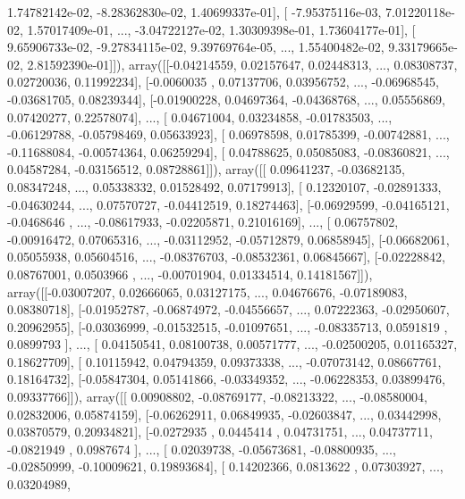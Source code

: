 \documentclass{article}
\begin{document}
          1.74782142e-02,  -8.28362830e-02,   1.40699337e-01],
       [ -7.95375116e-03,   7.01220118e-02,   1.57017409e-01, ...,
         -3.04722127e-02,   1.30309398e-01,   1.73604177e-01],
       [  9.65906733e-02,  -9.27834115e-02,   9.39769764e-05, ...,
          1.55400482e-02,   9.33179665e-02,   2.81592390e-01]]), array([[-0.04214559,  0.02157647,  0.02448313, ...,  0.08308737,
         0.02720036,  0.11992234],
       [-0.0060035 ,  0.07137706,  0.03956752, ..., -0.06968545,
        -0.03681705,  0.08239344],
       [-0.01900228,  0.04697364, -0.04368768, ...,  0.05556869,
         0.07420277,  0.22578074],
       ..., 
       [ 0.04671004,  0.03234858, -0.01783503, ..., -0.06129788,
        -0.05798469,  0.05633923],
       [ 0.06978598,  0.01785399, -0.00742881, ..., -0.11688084,
        -0.00574364,  0.06259294],
       [ 0.04788625,  0.05085083, -0.08360821, ...,  0.04587284,
        -0.03156512,  0.08728861]]), array([[ 0.09641237, -0.03682135,  0.08347248, ...,  0.05338332,
         0.01528492,  0.07179913],
       [ 0.12320107, -0.02891333, -0.04630244, ...,  0.07570727,
        -0.04412519,  0.18274463],
       [-0.06929599, -0.04165121, -0.0468646 , ..., -0.08617933,
        -0.02205871,  0.21016169],
       ..., 
       [ 0.06757802, -0.00916472,  0.07065316, ..., -0.03112952,
        -0.05712879,  0.06858945],
       [-0.06682061,  0.05055938,  0.05604516, ..., -0.08376703,
        -0.08532361,  0.06845667],
       [-0.02228842,  0.08767001,  0.0503966 , ..., -0.00701904,
         0.01334514,  0.14181567]]), array([[-0.03007207,  0.02666065,  0.03127175, ...,  0.04676676,
        -0.07189083,  0.08380718],
       [-0.01952787, -0.06874972, -0.04556657, ...,  0.07222363,
        -0.02950607,  0.20962955],
       [-0.03036999, -0.01532515, -0.01097651, ..., -0.08335713,
         0.0591819 ,  0.0899793 ],
       ..., 
       [ 0.04150541,  0.08100738,  0.00571777, ..., -0.02500205,
         0.01165327,  0.18627709],
       [ 0.10115942,  0.04794359,  0.09373338, ..., -0.07073142,
         0.08667761,  0.18164732],
       [-0.05847304,  0.05141866, -0.03349352, ..., -0.06228353,
         0.03899476,  0.09337766]]), array([[ 0.00908802, -0.08769177, -0.08213322, ..., -0.08580004,
         0.02832006,  0.05874159],
       [-0.06262911,  0.06849935, -0.02603847, ...,  0.03442998,
         0.03870579,  0.20934821],
       [-0.0272935 ,  0.0445414 ,  0.04731751, ...,  0.04737711,
        -0.0821949 ,  0.0987674 ],
       ..., 
       [ 0.02039738, -0.05673681, -0.08800935, ..., -0.02850999,
        -0.10009621,  0.19893684],
       [ 0.14202366,  0.0813622 ,  0.07303927, ...,  0.03204989,
\end{document}
